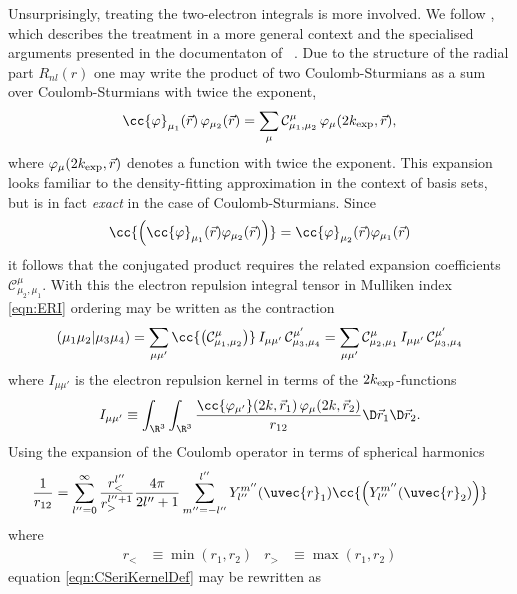 Unsurprisingly, treating the two-electron integrals is more involved.
We follow \cite{Avery2015},
which describes the treatment in a more general context
and the specialised arguments presented in the documentaton of
\sturmint~\cite{sturmintWeb}.
Due to the structure of the radial part $R_{nl}(r)$
one may write the product of two Coulomb-Sturmians as a
sum over Coulomb-Sturmians with twice the exponent, \ie
\newcommand{\csC}{\mathcal{C}}
\begin{equation}
	\cc{\varphi}_{\mu_1}(\vec{r}) \, \varphi_{\mu_2}(\vec{r})
	= \sum_{\mu} \csC^\mu_{\mu_1,\mu_2} \, \varphi_{\mu}(2\kexp, \vec{r}),
	\label{eqn:CSshellpairExpansion}
\end{equation}
where $\varphi_{\mu}(2k_\text{exp}, \vec{r})$ denotes a \CS function
with twice the exponent.
This expansion looks familiar to the density-fitting approximation
in the context of \cGTO basis sets,
but is in fact \emph{exact} in the case of Coulomb-Sturmians.
Since
\[ \cc{\left( \cc{\varphi}_{\mu_1}(\vec{r}) \varphi_{\mu_2}(\vec{r}) \right)} =
\cc{\varphi}_{\mu_2}(\vec{r}) \varphi_{\mu_1}(\vec{r}) \]
it follows that the conjugated product requires the related
expansion coefficients $\csC^\mu_{\mu_2,\mu_1}$.
With this the electron repulsion integral tensor in Mulliken index \eqref{eqn:ERI}
ordering may be written as the contraction
\begin{equation}
	\eriMu{\mu_1\mu_2}{\mu_3\mu_4}
		= \sum_{\mu\mu'} \cc{\left(\csC^\mu_{\mu_1,\mu_2}\right)} \,
		I_{\mu\mu'} \, \csC^{\mu'}_{\mu_3,\mu_4}
		= \sum_{\mu\mu'} \csC^\mu_{\mu_2,\mu_1} \,
		I_{\mu\mu'} \, \csC^{\mu'}_{\mu_3,\mu_4}
	\label{eqn:CSeriContraction}
\end{equation}
where $I_{\mu\mu'}$ is the electron repulsion kernel in terms of the $2k_\text{exp}$-functions
\begin{equation}
	I_{\mu\mu'} \equiv
	\int_{\R^3} \int_{\R^3}
	\frac{
	\cc{\varphi_{\mu'}}(2k,\vec{r}_1) \,
	\varphi_{\mu}(2k,\vec{r}_2)
	}{r_{12}}
	\D\vec{r}_1 \D\vec{r}_2.
	\label{eqn:CSeriKernelDef}
\end{equation}
Using the expansion of the Coulomb operator
in terms of spherical harmonics~\cite{Avery2018}
\[ \frac{1}{r_{12}} = \sum_{l''=0}^\infty
	\frac{r^{l''}_<}{r_>^{l'' + 1}} \frac{4\pi}{2l'' + 1}
	\sum_{m''=-{l''}}^{l''} Y_{l''}^{m''}(\uvec{r}_1)
	\cc{\left(Y_{l''}^{m''}(\uvec{r}_2)\right)}
\]
where
\begin{align*}
	r_< &\equiv \min(r_1, r_2) & r_> &\equiv \max(r_1, r_2)
\end{align*}
equation \eqref{eqn:CSeriKernelDef} may be rewritten as
